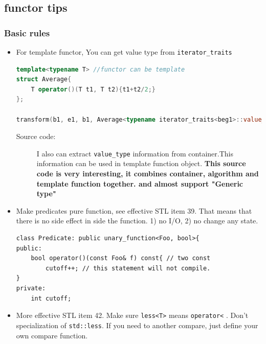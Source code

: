 \documentclass[a4paper,11pt,twoside]{book}
\begin{document}
\subsection{functor tips}
\subsubsection{Basic rules}

\begin{itemize}

	\item For template functor, You can get value type from \texttt{iterator\_traits}
\begin{lstlisting}[frame=single, language=c++]
template<typename T> //functor can be template 
struct Average{
	T operator()(T t1, T t2){t1+t2/2;}
};

transform(b1, e1, b1, Average<typename iterator_traits<beg1>::value_type>());
\end{lstlisting}
\begin{description}
	\item[Source code:] I also can extract \texttt{value\_type} information from container.This information can be used in template function object. \textbf{This source code is very interesting, it combines container, algorithm and template function together. and almost support "Generic type"}
\end{description}

\item Make predicates pure function, see effective STL item 39. That means that there is no side effect in side the function. 1) no I/O, 2) no change any state.
\begin{lstlisting}[numbers=none]
class Predicate: public unary_function<Foo, bool>{
public:
	bool operator()(const Foo& f) const{ // two const
		cutoff++; // this statement will not compile.
}
private:
	int cutoff;
\end{lstlisting}

\item More effective STL item 42. Make sure \texttt{less<T>} means \texttt{operator<} . Don't specialization of \texttt{std::less}. If you need to another compare, just define your own compare function.
\end{itemize}
\end{document}
